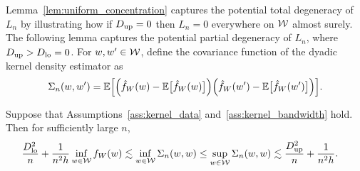 
Lemma~\ref{lem:uniform_concentration} captures the potential total degeneracy
of $L_n$ by illustrating how if $D_{\textup{up}}=0$ then $L_n=0$ everywhere on $\mathcal{W}$ almost
surely. The following lemma captures the potential partial degeneracy of $L_n$,
where $D_{\textup{up}} > D_{\textup{lo}} = 0$. For $w,w' \in \mathcal{W}$, define the covariance function of
the dyadic kernel density estimator as
%
\begin{equation*}
  \Sigma_n(w,w')
  =
  \mathbb{E}\Big[
    \Big(
      \hat f_W(w)
      - \mathbb{E}\big[\hat f_W(w)\big]
    \Big)
    \Big(
      \hat f_W(w')
      - \mathbb{E}\big[\hat f_W(w')\big]
    \Big)
  \Big].
\end{equation*}
%
\begin{lemma}
  \label{lem:variance_bounds}
  Suppose that Assumptions~\ref{ass:kernel_data}
  and~\ref{ass:kernel_bandwidth} hold.
  Then for sufficiently large $n$,
  \begin{align*}
    \frac{D_{\textup{lo}}^2}{n} + \frac{1}{n^2h}
    \inf_{w \in \mathcal{W}} f_W(w)
    &\lesssim
    \inf_{w \in \mathcal{W}} \Sigma_n(w,w)
    \leq
    \sup_{w \in \mathcal{W}} \Sigma_n(w,w)
    \lesssim
    \frac{D_{\textup{up}}^2}{n} + \frac{1}{n^2h}.
  \end{align*}
\end{lemma}


